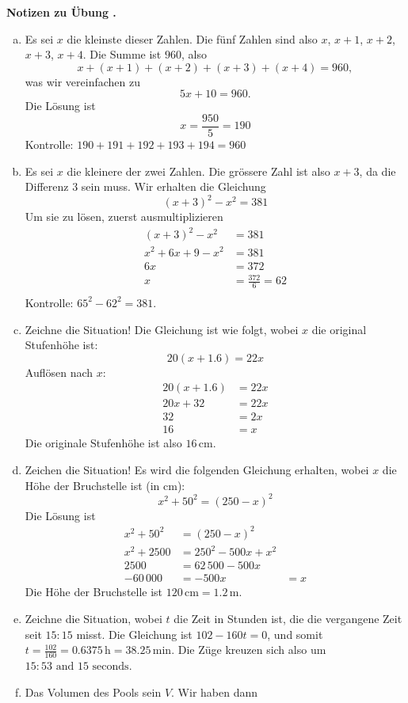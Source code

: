 \documentclass[%
11pt,%
twoside,%
titlepage,%
swissgerman,%
headsepline%
]{scrartcl}
\newcommand{\faReturnGray}{\textcolor{gray}{\faMailReply}} %
\theoremstyle{definition}
\theoremstyle{plain}
\newcommand{\concatueb}[1]{ueb:#1}%
\newcommand{\concatlsg}[1]{lsg:#1}%
\newcounter{uebcounter}[section]
\renewcommand{\theuebcounter}{\thesection.\arabic{uebcounter}}  %
\newenvironment{lsg}[1]{%
    \par\noindent\textbf{Notizen zu Übung \theuebcounter\label{\concatlsg{#1}}}
    \hfill\hyperref[\concatueb{#1}]{\faReturnGray}\par %
}{%
    \par%
}
\begin{document}
\begin{lsg}{saetzchenaufgaben}
    \begin{enumerate}[a)]
        \item Es sei $x$ die kleinste dieser Zahlen. Die fünf Zahlen sind also $x$, $x+1$, $x+2$, $x+3$, $x+4$. Die Summe ist $960$, also
        $$x+(x+1)+(x+2)+(x+3)+(x+4)=960,$$
        was wir vereinfachen zu $${5x+10=960}.$$
        Die Lösung ist $$x=\frac{950}{5}={190}$$ Kontrolle: $190+191+192+193+194=960$
        \item Es sei $x$ die kleinere der zwei Zahlen. Die grössere Zahl ist also $x+3$, da die Differenz $3$ sein muss. Wir erhalten die Gleichung $${(x+3)^2-x^2=381}$$ Um sie zu lösen, zuerst ausmultiplizieren
            \begin{align*}
                (x+3)^2-x^2 & =381 \\
                {x^2}+6x+9 -{x^2} & = 381\tag{$-9$}\\
                6x & = 372\tag{$\div6$}\\
                x & =\frac{372}{6}={62}\\ 
            \end{align*}
        Kontrolle: $65^2-62^2=381$.
        \item Zeichne die Situation!
        Die Gleichung ist wie folgt, wobei $x$ die original Stufenhöhe ist: $${20  (x+1.6) = 22x}$$ Auflösen nach $x$:
            \begin{align*}
                20  (x+1.6) & = 22x \\
                20x+32 & = 22x\tag{$-20x$}\\
                32 & = 2x\tag{$\div2$}\\
                {16} & =x 
            \end{align*}
        Die originale Stufenhöhe ist also $16\,\text{cm}$.
        \item Zeichen die Situation!
        Es wird die folgenden Gleichung erhalten, wobei $x$ die Höhe der Bruchstelle ist (in cm): $${x^2+50^2 = (250-x)^2}$$ Die Lösung ist
            \begin{align*}
                x^2+50^2 & = (250-x)^2 \\
                x^2+2500 & = 250^2-500x+x^2\tag{$-x^2$}\\
                2500 & = 62\,500-500x\tag{$-62\,500$}\\
                -60\,000 & = -500x\tag{$\div(-500)$\\
                {120} & =x 
            \end{align*}
        Die Höhe der Bruchstelle ist $120\,\text{cm}=1.2\,\text{m}$.
        \item Zeichne die Situation, wobei $t$ die Zeit in Stunden ist, die die vergangene Zeit seit $15:15$ misst.
        Die Gleichung ist ${102-160 t = 0}$, und somit $t=\frac{102}{160}=0.6375\,\text{h} = 38.25 \,\text{min}$. Die Züge kreuzen sich also um ${15:53 \mbox{ and } 15 \mbox{ seconds}}$.
        \item Das Volumen des Pools sein $V$. Wir haben dann
        

\end{enumerate}
\end{lsg}
\end{document}
